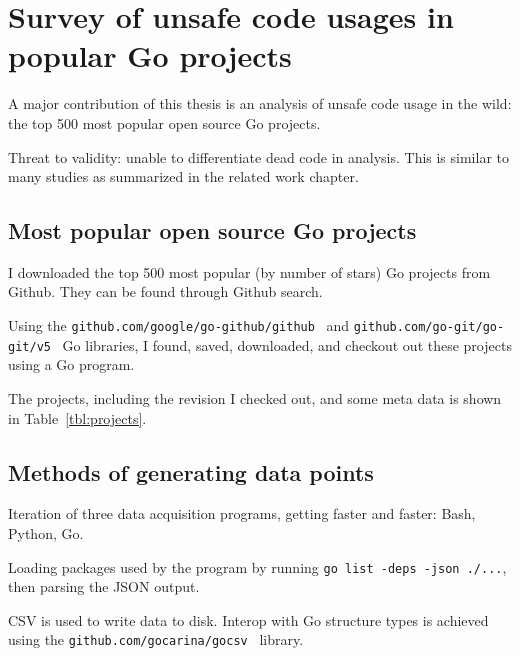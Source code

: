 
\chapter{Survey of unsafe code usages in popular Go projects}\label{ch:survey}

A major contribution of this thesis is an analysis of unsafe code usage in the wild:
the top 500 most popular open source Go projects.

Threat to validity: unable to differentiate dead code in analysis.
This is similar to many studies as summarized in the related work chapter.


\section{Most popular open source Go projects}\label{sec:most-popular-projects}

I downloaded the top 500 most popular (by number of stars) Go projects from Github.
They can be found through Github search.

Using the \texttt{github.com/google/go-github/github}~\cite{gogithub} and \texttt{github.com/go-git/go-git/v5}~\cite{gogit}
Go libraries, I found, saved, downloaded, and checkout out these projects using a Go program.

The projects, including the revision I checked out, and some meta data is shown in Table~\ref{tbl:projects}.



\section{Methods of generating data points}\label{sec:survey-acquisition-methods}

Iteration of three data acquisition programs, getting faster and faster: Bash, Python, Go.

Loading packages used by the program by running \texttt{go list -deps -json ./...}, then parsing the JSON output.

CSV is used to write data to disk.
Interop with Go structure types is achieved using the \texttt{github.com/gocarina/gocsv}~\cite{gocsv} library.

